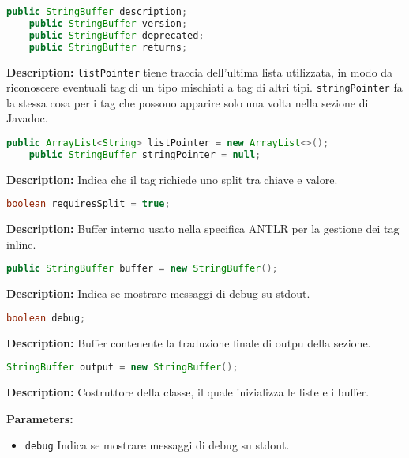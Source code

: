 \documentclass{article}
\begin{document}
\begin{lstlisting}[language=Java]
    public StringBuffer description;
    public StringBuffer version;
    public StringBuffer deprecated;
    public StringBuffer returns;
\end{lstlisting}
\vspace{0.5cm}
\textbf{Description:}  \texttt{listPointer} tiene traccia dell'ultima lista utilizzata, in modo da riconoscere eventuali tag di un tipo mischiati a tag di altri tipi. \texttt{stringPointer} fa la stessa cosa per i tag che possono apparire solo una volta nella sezione di Javadoc.

\begin{lstlisting}[language=Java]
    public ArrayList<String> listPointer = new ArrayList<>();
    public StringBuffer stringPointer = null;
\end{lstlisting}
\vspace{0.5cm}
\textbf{Description:} Indica che il tag richiede uno split tra chiave e valore.

\begin{lstlisting}[language=Java]
    boolean requiresSplit = true;
\end{lstlisting}
\vspace{0.5cm}
\textbf{Description:} Buffer interno usato nella specifica ANTLR per la gestione dei tag inline.

\begin{lstlisting}[language=Java]
    public StringBuffer buffer = new StringBuffer();
\end{lstlisting}
\vspace{0.5cm}
\textbf{Description:} Indica se mostrare messaggi di debug su stdout.

\begin{lstlisting}[language=Java]
    boolean debug;
\end{lstlisting}
\vspace{0.5cm}
\textbf{Description:} Buffer contenente la traduzione finale di outpu della sezione.

\begin{lstlisting}[language=Java]
    StringBuffer output = new StringBuffer();
\end{lstlisting}
\vspace{0.5cm}
\textbf{Description:}  Costruttore della classe, il quale inizializza le liste e i buffer.  

\textbf{Parameters:}
\begin{itemize}
  \item\texttt{debug} Indica se mostrare messaggi di debug su stdout.
\end{itemize}
\end{document}
